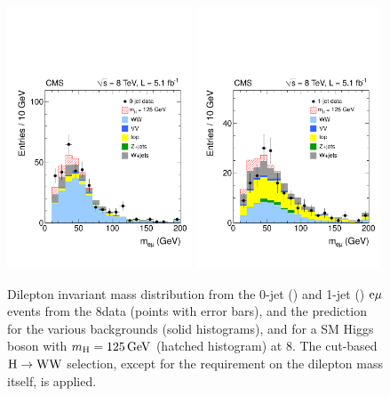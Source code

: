 \documentclass[11pt,twoside,a4paper,cmspaper,final,collab]{cms-tdr}
\begin{document}
\begin{figure}[h!t]
\begin{center}
   \includegraphics[width=0.49\textwidth]{figures/hww_hwwsel_0j_mh125_massem.pdf}
   \includegraphics[width=0.49\textwidth]{figures/hww_hwwsel_1j_mh125_massem.pdf}
	\caption{Dilepton invariant mass distribution from
	the 0-jet (\cmsLeft) and 1-jet (\cmsRight) $\mathrm{e}\mu$ events from the 8\TeV data (points with error bars),
        and the prediction for the various backgrounds (solid histograms), and for a SM Higgs boson
        with $m_{\mathrm{H}}=125\,\text{Ge\hspace{-.08em}V}$ (hatched histogram) at 8\TeV.
       The cut-based $\mathrm{H} \to \mathrm{W}\mathrm{W}$ selection, except for the requirement on the dilepton mass itself,
       is applied.}  \label{fig:hwwsel_nj_mh125_massem}
\end{center}
\end{figure}
\end{document}
